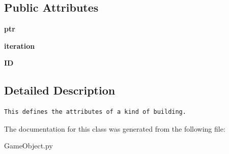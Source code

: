 \subsection*{Public Attributes}
\begin{CompactItemize}
\item 
\hypertarget{classGameObject_1_1BuildingType_24ed6d11c9c3a45f8f1ab8f5696d1e47}{
\textbf{ptr}}
\label{classGameObject_1_1BuildingType_24ed6d11c9c3a45f8f1ab8f5696d1e47}

\item 
\hypertarget{classGameObject_1_1BuildingType_6262e9784b8450dee03ed3cd8e412e3f}{
\textbf{iteration}}
\label{classGameObject_1_1BuildingType_6262e9784b8450dee03ed3cd8e412e3f}

\item 
\hypertarget{classGameObject_1_1BuildingType_12f29b224c0ab12334c94cff104ff17c}{
\textbf{ID}}
\label{classGameObject_1_1BuildingType_12f29b224c0ab12334c94cff104ff17c}

\end{CompactItemize}


\subsection{Detailed Description}


\footnotesize\begin{verbatim}This defines the attributes of a kind of building.
\end{verbatim}
\normalsize
 

The documentation for this class was generated from the following file:\begin{CompactItemize}
\item 
GameObject.py\end{CompactItemize}
